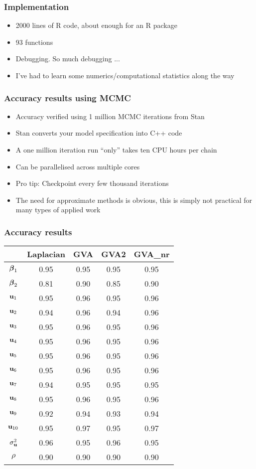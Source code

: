 \documentclass{beamer}
\begin{document}
\begin{frame}
\frametitle{Implementation}
\begin{itemize}
\item 2000 lines of R code, about enough for an R package
\item 93 functions
\item Debugging. So much debugging ...
\item I've had to learn some numerics/computational statistics along the
way
\end{itemize}
\end{frame}

\begin{frame}
\frametitle{Accuracy results using MCMC}
\begin{itemize}
\item Accuracy verified using 1 million MCMC iterations from Stan
\item Stan converts your model specification into C++ code
\item A one million iteration run ``only'' takes ten CPU hours per chain
\item Can be parallelised across multiple cores
\item Pro tip: Checkpoint every few thousand iterations
\item The need for approximate methods is obvious, this is simply not
practical for many types of applied work
\end{itemize}
\end{frame}

\begin{frame}
\frametitle{Accuracy results}
\begin{tabular}{ccccc}
\hline
	& Laplacian & GVA & GVA2 & GVA\_nr \\
\hline
${\boldsymbol \beta}_1$&0.95&0.95&0.95&0.95 \\
${\boldsymbol \beta}_2$&0.81&0.90&0.85&0.90 \\
${\bf u}_1$&0.95&0.96&0.95&0.96 \\
${\bf u}_2$&0.94&0.96&0.94&0.96 \\
${\bf u}_3$&0.95&0.96&0.95&0.96 \\
${\bf u}_4$&0.95&0.96&0.95&0.96 \\
${\bf u}_5$&0.95&0.96&0.95&0.96 \\
${\bf u}_6$&0.95&0.96&0.95&0.96 \\
${\bf u}_7$&0.94&0.95&0.95&0.95 \\
${\bf u}_8$&0.95&0.96&0.95&0.96 \\
${\bf u}_9$&0.92&0.94&0.93&0.94 \\
${\bf u}_{10}$&0.95&0.97&0.95&0.97 \\
$\sigma_{\bf u}^2$&0.96&0.95&0.96&0.95 \\
$\rho$&0.90&0.90&0.90&0.90 \\
\hline
\end{tabular}
\end{frame}
\end{document}
